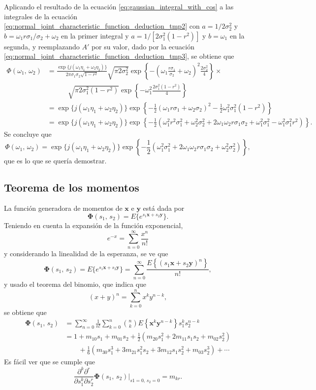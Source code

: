 \documentclass[a4paper]{report}
\newcommand{\x}{\mathbf{x}}
\newcommand{\y}{\mathbf{y}}
\newcommand{\Phibf}{\mathbf{\Phi}}
\begin{document}
Aplicando el resultado de la ecuación \ref{eq:gaussian_integral_with_cos} a las integrales  de la ecuación \ref{eq:normal_joint_characteristic_function_deduction_tmp2} con \(a=1/2\sigma^2_2\) y \(b=\omega_1r\sigma_1/\sigma_2+\omega_2\) en la primer integral y \(a=1/[2\sigma_1^2(1-r^2)]\) y \(b=\omega_1\) en la segunda, y reemplazando \(A'\) por su valor, dado por la ecuación \ref{eq:normal_joint_characteristic_function_deduction_tmp3}, se obtiene que
\begin{align*}
 \Phi(\omega_1,\,\omega_2)&=\frac{\exp\{j(\omega_1\eta_1+\omega_2\eta_2)\}}{2\pi\sigma_1\sigma_2\sqrt{1-r^2}}\sqrt{\pi2\sigma_2^2}\exp\left\{-\left(\omega_1\frac{r\sigma_1}{\sigma_2}+\omega_2\right)^2\frac{2\sigma_2^2}{4}\right\}\times\\
 &\qquad\quad \sqrt{\pi2\sigma_1^2(1-r^2)}\exp\left\{-\omega_1^2\frac{2\sigma_1^2(1-r^2)}{4}\right\}\\
  &=\exp\{j(\omega_1\eta_1+\omega_2\eta_2)\}\exp\left\{-\frac{1}{2}\left(\omega_1r\sigma_1+\omega_2\sigma_2\right)^2-\frac{1}{2}\omega_1^2\sigma_1^2(1-r^2)\right\}\\
  &=\exp\{j(\omega_1\eta_1+\omega_2\eta_2)\}\exp\left\{-\frac{1}{2}\left(\omega_1^2r^2\sigma_1^2+\omega_2^2\sigma_2^2+2\omega_1\omega_2r\sigma_1\sigma_2+\omega_1^2\sigma_1^2-\omega_1^2\sigma_1^2r^2\right)\right\}.
\end{align*}
Se concluye que
\[
 \Phi(\omega_1,\,\omega_2)=\exp\{j(\omega_1\eta_1+\omega_2\eta_2)\}\exp\left\{-\frac{1}{2}\left(\omega_1^2\sigma_1^2+2\omega_1\omega_2r\sigma_1\sigma_2+\omega_2^2\sigma_2^2\right)\right\},
\]
que es lo que se quería demostrar.


\subsection{Teorema de los momentos}

La función generadora de momentos de \(\x\) e \(\y\) está dada por
\[
 \Phibf(s_1,\,s_2)=E\{e^{s_1\x+s_2\y}\}.
\]
Teniendo en cuenta la expansión de la función exponencial,
\[
 e^{-x}=\sum_{n=0}^{\infty}\frac{x^n}{n!}
\]
y considerando la linealidad de la esperanza, se ve que
\[
 \Phibf(s_1,\,s_2)=E\{e^{s_1\x+s_2\y}\}=\sum_{n=0}^{\infty}\frac{E\left\{(s_1\x+s_2\y)^n\right\}}{n!},
\]
y usado el teorema del binomio, que indica que
\[
 (x+y)^n=\sum_{k=0}^{n}x^ky^{n-k},
\]
se obtiene que
\begin{align}\label{eq:joint_moment_generating_function}
 \Phibf(s_1,\,s_2)&=\sum_{n=0}^{\infty}\frac{1}{n!}\sum_{k=0}^{n}\binom{n}{k} E\left\{\x^k\y^{n-k}\right\}s_1^ks_2^{n-k}\nonumber\\
  &=1+m_{10}s_1+m_{01}s_2+\frac{1}{2}(m_{20}s_1^2+2m_{11}s_1s_2+m_{02}s_2^2)\nonumber\\
  &\qquad+\frac{1}{6}(m_{30}s_1^3+3m_{21}s_1^2s_2+3m_{12}s_1s_2^2+m_{03}s_2^3)+\cdots
\end{align}
Es fácil ver que se cumple que
\[
 \frac{\partial^k\partial^r}{\partial s_1^k\partial s_2^r}\Phibf(s_1,\,s_2)\bigg|_{s1=0,\,s_2=0}=m_{kr}.
\]
\end{document}
